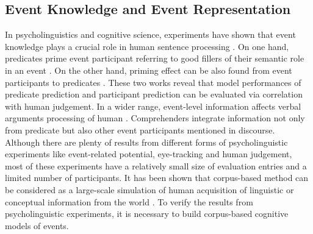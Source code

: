 \documentclass[a4paper]{article}
\begin{document}
\subsection{Event Knowledge and Event Representation} \label{sec:event}
In psycholinguistics and cognitive science, experiments have shown that event knowledge plays a crucial role in human sentence processing \citep{camblin2007interplay}. On one hand, predicates prime event participant referring to good fillers of their semantic role in an event \citep{ferretti2001integrating}. On the other hand, priming effect can be also found from event participants to predicates \citep{mcrae2005basis}. These two works reveal that model performances of predicate prediction and participant prediction can be evaluated via correlation with human judgement. In a wider range, event-level information affects verbal arguments processing of human \citep{bicknell2010effects}. Comprehenders integrate information not only from predicate but also other event participants mentioned in discourse. Although there are plenty of results from different forms of psycholinguistic experiments like event-related potential, eye-tracking and human judgement, most of these experiments have a relatively small size of evaluation entries and a limited number of participants. It has been shown that corpus-based method can be considered as a large-scale simulation of human acquisition of linguistic or conceptual information from the world \citep{landauer1997solution}. To verify the results from psycholinguistic experiments, it is necessary to build corpus-based cognitive models of events. 
\end{document}

